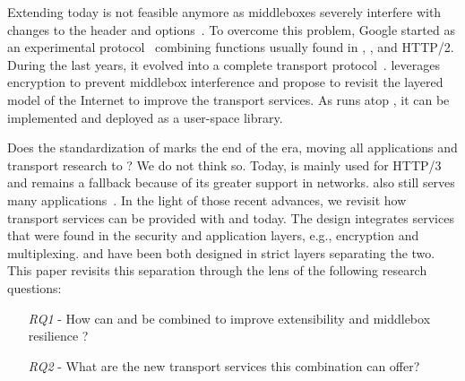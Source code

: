 Extending \tcp today is not feasible anymore as middleboxes severely interfere
with changes to the \tcp header and
options~\cite{medina2004measuring,honda2011still,edeline2019bottom}.
To overcome this problem, Google started \quic as an experimental
protocol~\cite{roskind2013quic,langley2017quic} combining functions usually
found in \tcp, \tls, and HTTP/2. During the last years, it
evolved into a complete transport protocol~\cite{rfc9000}.
\quic leverages encryption to prevent middlebox interference and propose to
revisit the layered model of the Internet to improve the transport services.
As \quic runs atop \udp, it can be implemented and deployed as a user-space library.

Does the standardization of \quic marks the end of the \tcp era, moving
all applications and transport research to \quic?  We do not think
so. Today, \quic is mainly used for HTTP/3~\cite{http3} and \tcp remains a
fallback because of its greater support in networks. \tcp also still serves many  applications~\cite{covid19,fiveyears}.
%
In the light of those recent advances, we revisit how transport services can be
provided with \tcp and \tls today. The \quic design integrates services
that were found in the security and application layers, e.g., encryption and multiplexing.
\tcp and \tls have been both designed in strict layers separating the two.
This paper revisits this separation through the lens of the following research questions:

\begin{itemize}
	\item[{\small{\textit{RQ1}}} -] How can \tcp and \tls be
	combined to improve extensibility and middlebox resilience ?
	\item[{\small{\textit{RQ2}}} -] What are the new transport services this
	combination can offer?
\end{itemize}

